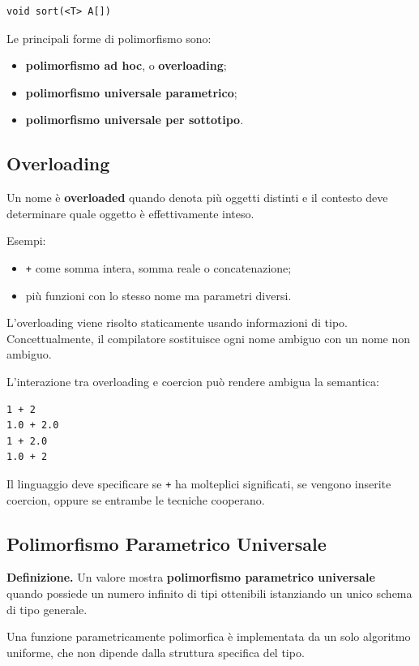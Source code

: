 \documentclass{article}
\begin{document}
\begin{lstlisting}
void sort(<T> A[])
\end{lstlisting}

Le principali forme di polimorfismo sono:
\begin{itemize}
  \item \textbf{polimorfismo ad hoc}, o \textbf{overloading};
  \item \textbf{polimorfismo universale parametrico};
  \item \textbf{polimorfismo universale per sottotipo}.
\end{itemize}

\subsection{Overloading}

Un nome è \textbf{overloaded} quando denota più oggetti distinti e il contesto deve determinare quale oggetto è effettivamente inteso.

Esempi:
\begin{itemize}
  \item \texttt{+} come somma intera, somma reale o concatenazione;
  \item più funzioni con lo stesso nome ma parametri diversi.
\end{itemize}

L'overloading viene risolto staticamente usando informazioni di tipo. Concettualmente, il compilatore sostituisce ogni nome ambiguo con un nome non ambiguo.

L'interazione tra overloading e coercion può rendere ambigua la semantica:

\begin{lstlisting}
1 + 2
1.0 + 2.0
1 + 2.0
1.0 + 2
\end{lstlisting}

Il linguaggio deve specificare se \texttt{+} ha molteplici significati, se vengono inserite coercion, oppure se entrambe le tecniche cooperano.

\subsection{Polimorfismo Parametrico Universale}

\textbf{Definizione.} Un valore mostra \textbf{polimorfismo parametrico universale} quando possiede un numero infinito di tipi ottenibili istanziando un unico schema di tipo generale.

Una funzione parametricamente polimorfica è implementata da un solo algoritmo uniforme, che non dipende dalla struttura specifica del tipo.
\end{document}
